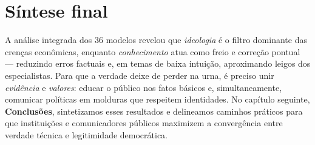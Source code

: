 \section{Síntese final}

A análise integrada dos 36 modelos revelou que \emph{ideologia} é o filtro dominante das crenças econômicas, enquanto \emph{conhecimento} atua como freio e correção pontual — reduzindo erros factuais e, em temas de baixa intuição, aproximando leigos dos especialistas. Para que a verdade deixe de perder na urna, é preciso unir \emph{evidência} e \emph{valores}: educar o público nos fatos básicos e, simultaneamente, comunicar políticas em molduras que respeitem identidades. No capítulo seguinte, \textbf{Conclusões}, sintetizamos esses resultados e delineamos caminhos práticos para que instituições e comunicadores públicos maximizem a convergência entre verdade técnica e legitimidade democrática. 